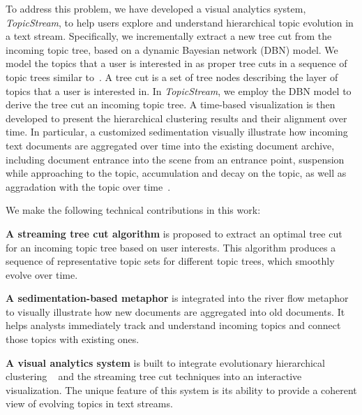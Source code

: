 To address this problem, we have developed a visual analytics system, \emph{\normalsize TopicStream}, to help users explore and understand hierarchical topic evolution in a text stream.
Specifically, we incrementally extract a new tree cut from the incoming topic tree, based on a dynamic Bayesian network (DBN) model.
We model the topics that a user is interested in as proper tree cuts in a sequence of topic trees similar to~\cite{cui2014}.
A tree cut is a set of tree nodes describing the layer of topics that a user is interested in.
In \emph{\normalsize TopicStream}, we employ the DBN model to derive the tree cut  an incoming topic tree.
A time-based visualization is then developed to present the hierarchical clustering results and their alignment over time.
In particular,  a customized sedimentation  visually illustrate how incoming text documents are aggregated over time into the existing document archive, including document entrance into the scene from an entrance point, suspension while approaching to the topic, accumulation and decay on the topic, as well as aggradation with the topic over time~\cite{Wang2013}.

We make the following technical contributions in this work:
\begin{compactitem}
\item \textbf{\normalsize A streaming tree cut algorithm} is proposed to extract an optimal tree cut for an incoming topic tree based on user interests. This algorithm produces a sequence of representative topic sets for different topic trees, which smoothly evolve over time.
\item \textbf{\normalsize A sedimentation-based metaphor} is integrated into the river flow metaphor to visually illustrate how new documents are aggregated into old documents. It helps analysts immediately track and understand incoming topics and connect those topics with existing ones.
\item \textbf{\normalsize A visual analytics system} is built to integrate evolutionary hierarchical clustering ~\cite{Wang2013} and the streaming tree cut techniques into an interactive visualization. The unique feature of this system is its ability to provide a coherent view of evolving topics in text streams.
\end{compactitem}


